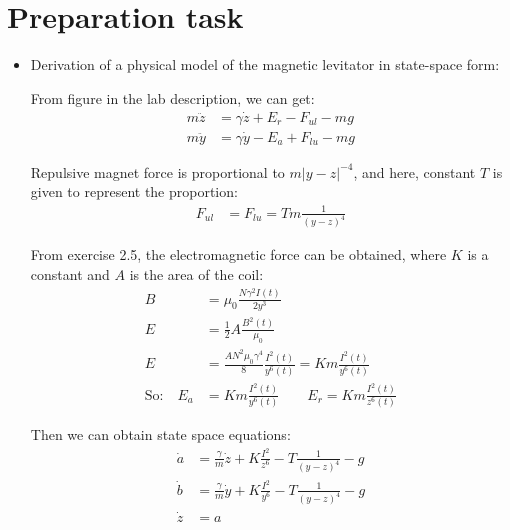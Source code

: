 \documentclass[10pt,a4paper]{article}
\begin{document}
\begin{titlepage}

\end{titlepage}
\newpage
\pagestyle{plain}
\section{Preparation task}
\begin{itemize}
    \item Derivation of a physical model of the magnetic levitator in state-space form:
    \par From figure in the lab description, we can get:
	\begin{align}
		m \ddot{z} &= \gamma \dot{z} + E_{r} - F_{ul} - mg \\
		m \ddot{y} &= \gamma \dot{y} - E_{a} + F_{lu} - mg
	\end{align}
	\par Repulsive magnet force is proportional to $m \vert y - z \vert^{-4}$, and here, constant $T$ is given to represent the proportion:
	\begin{align}
		F_{ul} &= F_{lu} = T m \frac{1}{(y - z)^{4}}
	\end{align}
	\par From exercise 2.5, the electromagnetic force can be obtained, where $K$ is a constant and $A$ is the area of the coil:
	\begin{align}
		B &= \mu_{0} \frac{N \gamma^{2} I(t)}{2 y^{3}} \\
		E &= \frac{1}{2} A \frac{B^{2}(t)}{\mu_{0}} \\
		E &= \frac{A N^{2} \mu_{0} \gamma^{4}}{8} \frac{I^{2}(t)}{y^{6}(t)} = K m \frac{I^{2}(t)}{y^{6}(t)} \\
		\text{So:} \quad E_{a} &= K m \frac{I^{2}(t)}{y^{6}(t)} \qquad E_{r} = K m \frac{I^{2}(t)}{z^{6}(t)}
	\end{align}
	\par Then we can obtain state space equations:
	\begin{align}
		\dot{a} &= \frac{\gamma}{m} \dot{z} + K \frac{I^{2}}{z^{6}} - T \frac{1}{(y - z)^{4}} - g \\
		\dot{b} &= \frac{\gamma}{m} \dot{y} + K \frac{I^{2}}{y^{6}} - T \frac{1}{(y - z)^{4}} - g \\
		\dot{z} &= a \\

\end{align}
\end{itemize}
\end{document}
